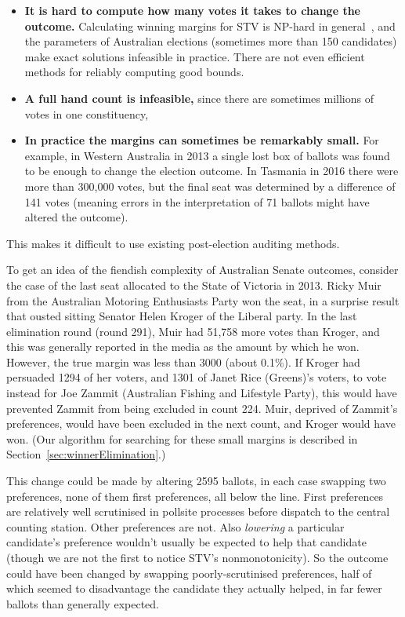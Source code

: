 \documentclass[10pt,a4paper]{article}
\newcommand{\shortVersion}[1]{}
\newcommand{\longVersion}[1]{#1}
\newcommand{\shortVersion}[1]{#1}
\newcommand{\longVersion}[1]{}
\begin{document}
\begin{itemize}
	\item {\bf It is hard to compute how many votes it takes to change the outcome.}  Calculating winning margins for STV is NP-hard in general~\cite{Xia2012}, and the parameters of Australian elections (sometimes more than 150 candidates) make exact solutions infeasible in practice.  There are not even efficient methods for reliably computing good bounds. 	
	\item {\bf A full hand count is infeasible,} since there are sometimes millions of votes in one constituency, 
	\item {\bf In practice the margins can sometimes be remarkably small.}  For example, in Western Australia in 2013 a single lost box of ballots was found to be enough to change the election outcome.  In Tasmania in 2016 there were more than 300,000 votes, but the final seat was determined by a difference of 141 votes 
	(meaning errors in the interpretation of 71 ballots might have altered the outcome).	
\end{itemize}

This makes it difficult to use existing post-election auditing methods.   


To get an idea of the fiendish complexity of Australian Senate outcomes, consider the case of the last seat allocated to the State of Victoria in 2013.  Ricky Muir from the Australian Motoring Enthusiasts Party won the seat, in a surprise result that ousted sitting Senator 
Helen Kroger of the Liberal party.  In the last elimination round (round 291), Muir had 51,758 more votes than Kroger, and this was generally reported in the media as the amount by which he won.  However, the true margin was less than 3000 (about 0.1\%).  
If Kroger had persuaded 1294 of her voters, and 1301 of Janet Rice (Greens)’s voters, to  vote instead for Joe Zammit (Australian Fishing and Lifestyle Party), this would have prevented Zammit from being excluded in count 224. Muir, deprived of Zammit's preferences, would have been excluded in the next count, and Kroger would have won.   (Our algorithm for searching for these small margins is described in \longVersion{Section~\ref{sec:winnerElimination}.)}
\shortVersion{the full version of this paper.)}


This change could be made by altering 2595 ballots, in each case swapping two preferences, none of them first preferences, all below the line.  First preferences are relatively well scrutinised in pollsite processes before dispatch to the central counting station.  Other preferences are not.   Also \emph{lowering} a particular candidate's preference wouldn't usually be expected to help that candidate (though we are not the first to notice STV's nonmonotonicity).  So the outcome could have been changed by swapping poorly-scrutinised preferences, half of which seemed to disadvantage the candidate they actually helped, in far fewer ballots than generally expected.  
\end{document}
